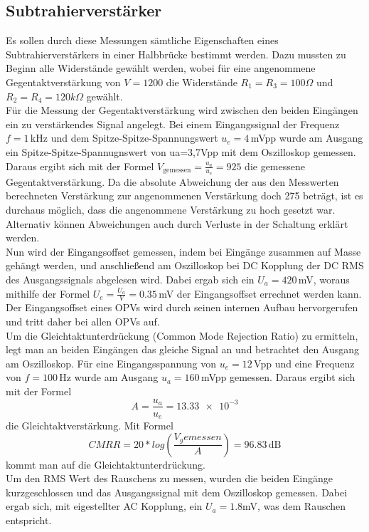 \subsection{Subtrahierverstärker}
\label{sec:subtrahier}
Es sollen durch diese Messungen sämtliche Eigenschaften eines Subtrahierverstärkers in einer Halbbrücke bestimmt werden. Dazu mussten zu Beginn alle Widerstände gewählt werden, wobei für eine angenommene Gegentaktverstärkung von $V=1200$ die Widerstände $R_1=R_3=100\Omega$ und $R_2=R_4=120k\Omega$ gewählt. \\
Für die Messung der Gegentaktverstärkung wird zwischen den beiden Eingängen ein zu verstärkendes Signal angelegt. Bei einem Eingangssignal der Frequenz $f=1\,$kHz und dem Spitze-Spitze-Spannungswert $u_e=4\,$mVpp wurde am Ausgang ein Spitze-Spitze-Spannugnswert von ua=3,7Vpp mit dem Oszilloskop gemessen. Daraus ergibt sich mit der Formel $V_\text{gemessen}=\frac{u_a}{u_e}=925$ die gemessene Gegentaktverstärkung. Da die absolute Abweichung der aus den Messwerten berechneten Verstärkung zur angenommenen Verstärkung doch 275 beträgt, ist es durchaus möglich, dass die angenommene Verstärkung zu hoch gesetzt war. Alternativ können Abweichungen auch durch Verluste in der Schaltung erklärt werden. \\
Nun wird der Eingangsoffset gemessen, indem bei Eingänge zusammen auf Masse gehängt werden, und anschließend am Oszilloskop bei DC Kopplung der DC RMS des Ausgangssignals abgelesen wird. Dabei ergab sich ein $U_a=420\,$mV, woraus mithilfe der Formel $U_e=\frac{U_a}{V}=0.35\,$mV der Eingangsoffset errechnet werden kann. Der Eingangsoffset eines OPVs wird durch seinen internen Aufbau hervorgerufen und tritt daher bei allen OPVs auf. \\
Um die Gleichtaktunterdrückung (Common Mode Rejection Ratio) zu ermitteln, legt man an beiden Eingängen das gleiche Signal an und betrachtet den Ausgang am Oszilloskop. Für eine Eingangsspannung von $u_e=12\,$Vpp und eine Frequenz von $f=100\,$Hz wurde am Ausgang $u_a=160\,$mVpp gemessen. Daraus ergibt sich mit der Formel
\begin{equation}
	A=\frac{u_a}{u_e}=\num{13.33e-3}
\end{equation}
die Gleichtaktverstärkung. Mit Formel 
\begin{equation}
	CMRR=20*log(\frac{V_gemessen}{A})=96.83\,\text{dB} 
\end{equation}
kommt man auf die Gleichtaktunterdrückung. \\
Um den RMS Wert des Rauschens zu messen, wurden die beiden Eingänge kurzgeschlossen und das Ausgangssignal mit dem Oszilloskop gemessen. Dabei ergab sich, mit eigestellter AC Kopplung, ein $U_a=1.8$mV, was dem Rauschen entspricht.

